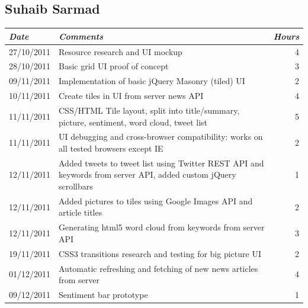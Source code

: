 \documentclass{report}
\begin{document}
	  \subsection{Suhaib Sarmad}
	    \begin{tabular}{l | p{10cm} r}
	     \emph{\large Date} & \emph{\large Comments} & \emph{\large Hours}\\
	     \hline
	     27/10/2011 & Resource research and UI mockup & 4\\
	     28/10/2011 & Basic grid UI proof of concept & 3\\
	     09/11/2011 & Implementation of basic jQuery Masonry (tiled) UI & 2\\
	     10/11/2011 & Create tiles in UI from server news API & 4\\
	     11/11/2011 & CSS/HTML Tile layout, split into title/summary, picture, sentiment, word cloud, tweet list & 5\\
	     11/11/2011 & UI debugging and cross-browser compatibility: works on all tested browsers except IE & 2\\
	     12/11/2011 & Added tweets to tweet list using Twitter REST API and keywords from server API, added custom jQuery scrollbars & 1\\
	     12/11/2011 & Added pictures to tiles using Google Images API and article titles & 2\\
	     12/11/2011 & Generating html5 word cloud from keywords from server API & 3\\
	     19/11/2011 & CSS3 transitions research and testing for big picture UI & 2\\
	     01/12/2011 & Automatic refreshing and fetching of new news articles from server & 4\\
	     09/12/2011 & Sentiment bar prototype & 1
	    \end{tabular}
\end{document}
